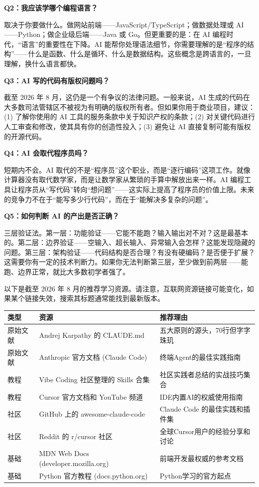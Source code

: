 \textbf{Q2：我应该学哪个编程语言？}

取决于你要做什么。做网站前端——JavaScript/TypeScript；做数据处理或 AI——Python；做企业级后端——Java 或 Go。但更重要的是：在 AI 编程时代，“语言”的重要性在下降。AI 能帮你处理语法细节，你需要理解的是“程序的结构”——什么是函数、什么是循环、什么是数据结构。这些概念是跨语言的，一旦理解，换什么语言都快。

\textbf{Q3：AI 写的代码有版权问题吗？}

截至 2026 年 8 月，这仍是一个有争议的法律问题。一般来说，AI 生成的代码在大多数司法管辖区不被视为有明确的版权所有者。但如果你用于商业项目，建议：(1) 了解你使用的 AI 工具的服务条款中关于知识产权的条款；(2) 对关键代码进行人工审查和修改，使其具有你的创造性投入；(3) 避免让 AI 直接复制可能有版权的开源代码。

\textbf{Q4：AI 会取代程序员吗？}

短期内不会。AI 取代的不是“程序员”这个职业，而是“逐行编码”这项工作。就像计算器没有取代数学家，而是让数学家从繁琐的手算中解放出来一样。AI 编程工具让程序员从“写代码”转向“想问题”——这实际上提高了程序员的价值上限。未来的竞争力不在于“能写多少行代码”，而在于“能解决多复杂的问题”。

\textbf{Q5：如何判断 AI 的产出是否正确？}

三层验证法。第一层：功能验证——它能不能跑？输入输出对不对？这是最基本的。第二层：边界验证——空输入、超长输入、异常输入会怎样？这能发现隐藏的问题。第三层：架构验证——代码结构是否合理？有没有硬编码？是否便于扩展？这需要你有一定的技术判断力。如果你无法判断第三层，至少做到前两层——能跑、边界正常，就比大多数初学者强了。


以下是截至 2026 年 8 月的推荐学习资源。请注意，互联网资源链接可能变化，如果某个链接失效，搜索其标题通常能找到最新版本。

\begin{center}
\begin{tabularx}{\linewidth}{|X|X|X|}
\hline
\textbf{类型} & \textbf{资源} & \textbf{推荐理由} \tabularnewline
\hline
原始文献 & Andrej Karpathy 的 CLAUDE.md & 五大原则的源头，70行但字字珠玑 \tabularnewline
原始文献 & Anthropic 官方文档 (Claude Code) & 终端Agent的最佳实践指南 \tabularnewline
教程 & Vibe Coding 社区整理的 Skills 合集 & 社区实践者总结的实战技巧集合 \tabularnewline
教程 & Cursor 官方文档和 YouTube 频道 & IDE内置AI的权威使用指南 \tabularnewline
社区 & GitHub 上的 awesome-claude-code & Claude Code 的最佳实践和插件集 \tabularnewline
社区 & Reddit 的 r/cursor 社区 & 全球Cursor用户的经验分享和讨论 \tabularnewline
基础 & MDN Web Docs (developer.mozilla.org) & 前端开发最权威的参考文档 \tabularnewline
基础 & Python 官方教程 (docs.python.org) & Python学习的官方起点 \tabularnewline
\hline
\end{tabularx}
\end{center}

